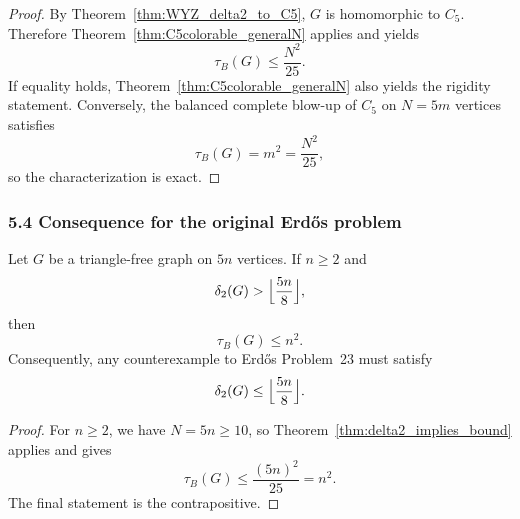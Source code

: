 \begin{proof}
By Theorem~\ref{thm:WYZ_delta2_to_C5}, $G$ is homomorphic to $C_5$.
Therefore Theorem~\ref{thm:C5colorable_generalN} applies and yields
\[
\tau_B(G)\le \frac{N^2}{25}.
\]
If equality holds, Theorem~\ref{thm:C5colorable_generalN} also yields the rigidity statement.
Conversely, the balanced complete blow-up of $C_5$ on $N=5m$ vertices satisfies
\[
\tau_B(G)=m^2=\frac{N^2}{25},
\]
so the characterization is exact.
\end{proof}

\subsubsection*{5.4 Consequence for the original Erd\H{o}s problem}
\begin{corollary}\label{cor:original_delta2}
Let $G$ be a triangle-free graph on $5n$ vertices.
If $n\ge 2$ and
\[
\delta_2(G)>\Bigl\lfloor\frac{5n}{8}\Bigr\rfloor,
\]
then
\[
\tau_B(G)\le n^2.
\]
Consequently, any counterexample to Erd\H{o}s Problem~23 must satisfy
\[
\delta_2(G)\le \Bigl\lfloor\frac{5n}{8}\Bigr\rfloor.
\]
\end{corollary}

\begin{proof}
For $n\ge 2$, we have $N=5n\ge 10$, so Theorem~\ref{thm:delta2_implies_bound} applies and gives
\[
\tau_B(G)\le \frac{(5n)^2}{25}=n^2.
\]
The final statement is the contrapositive.
\end{proof}

